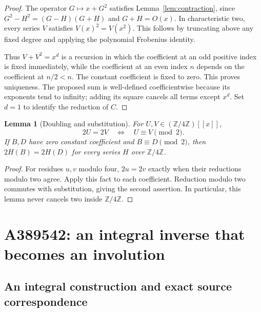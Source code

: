 \documentclass[11pt,a4paper]{article}
\newtheorem{lemma}[theorem]{Lemma}
\theoremstyle{remark}
\newcommand{\Z}{\mathbb Z}
\begin{document}
\begin{proof}
The operator $G\mapsto x+G^2$ satisfies Lemma~\ref{lem:contraction},
since $G^2-H^2=(G-H)(G+H)$ and $G+H=O(x)$. In characteristic two,
every series $V$ satisfies $V(x)^2=V(x^2)$. This follows by truncating
above any fixed degree and applying the polynomial Frobenius identity.

Thus $V+V^2=x^d$ is a recursion in which the coefficient at an odd positive
index is fixed immediately, while the coefficient at an even index $n$
depends on the coefficient at $n/2<n$. The constant coefficient is fixed
to zero. This proves uniqueness. The proposed sum is well-defined
coefficientwise because its exponents tend to infinity; adding its square
cancels all terms except $x^d$. Set $d=1$ to identify the reduction of $C$.
\end{proof}

\begin{lemma}[Doubling and substitution]\label{lem:double}
For $U,V\in(\Z/4\Z)[[x]]$,
\[
 2U=2V\quad\Longleftrightarrow\quad
 U\equiv V\pmod2.
\]
If $B,D$ have zero constant coefficient and $B\equiv D\pmod2$, then
$2H(B)=2H(D)$ for every series $H$ over $\Z/4\Z$.
\end{lemma}

\begin{proof}
For residues $u,v$ modulo four, $2u=2v$ exactly when their reductions modulo
two agree. Apply this fact to each coefficient. Reduction modulo two
commutes with substitution, giving the second assertion. In particular,
this lemma never cancels two inside $\Z/4\Z$.
\end{proof}

\section{A389542: an integral inverse that becomes an involution}

\subsection{An integral construction and exact source correspondence}
\end{document}
